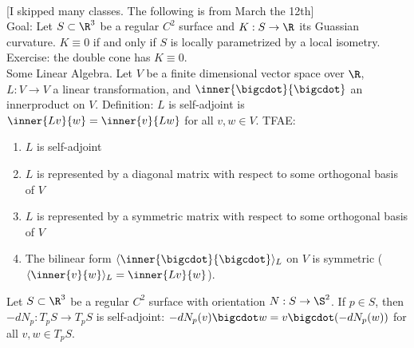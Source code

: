 \td \td \td \td \td\\

[I skipped many classes. The following is from March the 12th]\\

Goal: Let $S \subset \R^3$ be a regular $C^2$ surface and $K : S \to \R$ its Guassian curvature. $K \equiv 0$ if and only if $S$ is locally parametrized by a local isometry.\\

Exercise: the double cone has $K \equiv 0$. \td \\

Some Linear Algebra. Let $V$ be a finite dimensional vector space over $\R$, $L : V \to V$ a linear transformation, and $\inner{\bigcdot}{\bigcdot}$ an innerproduct on $V$. Definition: $L$ is self-adjoint is $\inner{Lv}{w} = \inner{v}{Lw}$ for all $v,w \in V$. TFAE:
\begin{enumerate}
    \item $L$ is self-adjoint 
    \item $L$ is represented by a diagonal matrix with respect to some orthogonal basis of $V$
    \item $L$ is represented by a symmetric matrix with respect to some orthogonal basis of $V$
    \item The bilinear form $\langle \inner{\bigcdot}{\bigcdot} \rangle_L$ on $V$ is symmetric ($\langle \inner{v}{w} \rangle_L = \inner{Lv}{w}$).
\end{enumerate}

\begin{lemma}
    Let $S\subset \R^3$ be a regular $C^2$ surface with orientation $N : S \to \S^2$. If $p \in S$, then $-dN_p : T_p S \to T_p S$ is self-adjoint: $-dN_p(v)\bigcdot w = v\bigcdot (-dN_p(w))$ for all $v,w \in T_p S$.
\end{lemma}

